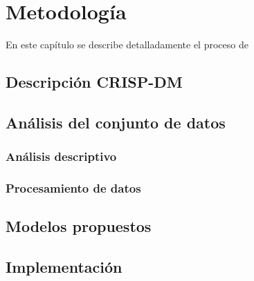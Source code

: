 \chapter{Metodología}\label{chapter:methods}

En este capítulo se describe detalladamente el proceso de


\section{Descripción CRISP-DM}

\section{Análisis del conjunto de datos}

\subsection{Análisis descriptivo}

\subsection{Procesamiento de datos}


\section{Modelos propuestos}


\section{Implementación}




